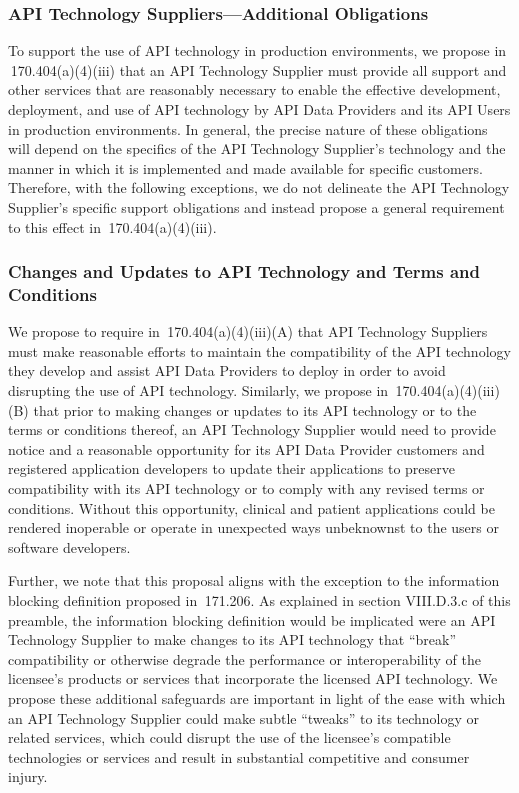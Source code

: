 \documentclass[twoside,11pt]{article}
\begin{document}
          \subsubsection{API Technology Suppliers—Additional Obligations}


          To support the use of API technology in production environments, we propose in \textsection{} 170.404(a)(4)(iii) that an API Technology Supplier must provide all support and other services that are reasonably necessary to enable the effective development, deployment, and use of API technology by API Data Providers and its API Users in production environments. In general, the precise nature of these obligations will depend on the specifics of the API Technology Supplier's technology and the manner in which it is implemented and made available for specific customers. Therefore, with the following exceptions, we do not delineate the API Technology Supplier's specific support obligations and instead propose a general requirement to this effect in \textsection{} 170.404(a)(4)(iii). \ifhmode\expandafter\xspace\fi 
          


          \subsubsection{Changes and Updates to API Technology and Terms and Conditions}

          We propose to require in \textsection{} 170.404(a)(4)(iii)(A) that API Technology Suppliers must make reasonable efforts to maintain the compatibility of the API technology they develop and assist API Data Providers to deploy in order to avoid disrupting the use of API technology. Similarly, we propose in \textsection{} 170.404(a)(4)(iii)(B) that prior to making changes or updates to its API technology or to the terms or conditions thereof, an API Technology Supplier would need to provide notice and a reasonable opportunity for its API Data Provider customers and registered application developers to update their applications to preserve compatibility with its API technology or to comply with any revised terms or conditions. Without this opportunity, clinical and patient applications could be rendered inoperable or operate in unexpected ways unbeknownst to the users or software developers.


          Further, we note that this proposal aligns with the exception to the information blocking definition proposed in \textsection{} 171.206. As explained in section VIII.D.3.c of this preamble, the information blocking definition would be implicated were an API Technology Supplier to make changes to its API technology that “break” compatibility or otherwise degrade the performance or interoperability of the licensee's products or services that incorporate the licensed API technology. We propose these additional safeguards are important in light of the ease with which an API Technology Supplier could make subtle “tweaks” to its technology or related services, which could disrupt the use of the licensee's compatible technologies or services and result in substantial competitive and consumer injury.
\end{document}
